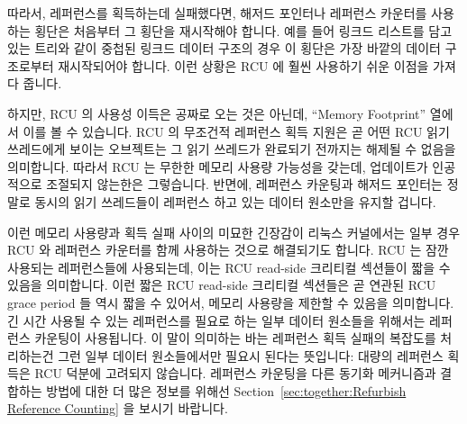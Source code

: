 따라서, 레퍼런스를 획득하는데 실패했다면, 해저드 포인터나 레퍼런스 카운터를
사용하는 횡단은 처음부터 그 횡단을 재시작해야 합니다.
예를 들어 링크드 리스트를 담고 있는 트리와 같이 중첩된 링크드 데이터 구조의
경우 이 횡단은 가장 바깥의 데이터 구조로부터 재시작되어야 합니다.
이런 상황은 RCU 에 훨씬 사용하기 쉬운 이점을 가져다 줍니다.
\iffalse

Thus, when failing to acquire a reference, a hazard-pointer or
reference-counter traversal must restart that traversal from the
beginning.
In the case of nested linked data structures, for example, a
tree containing linked lists, the traversal must be restarted from
the outermost data structure.
This situation gives RCU a significant ease-of-use advantage.
\fi

하지만, RCU 의 사용성 이득은 공짜로 오는 것은 아닌데, ``Memory Footprint''
열에서 이를 볼 수 있습니다.
RCU 의 무조건적 레퍼런스 획득 지원은 곧 어떤 RCU 읽기 쓰레드에게 보이는
오브젝트는 그 읽기 쓰레드가 완료되기 전까지는 해제될 수 없음을 의미합니다.
따라서 RCU 는 무한한 메모리 사용량 가능성을 갖는데, 업데이트가 인공적으로
조절되지 않는한은 그렇습니다.
반면에, 레퍼런스 카운팅과 해저드 포인터는 정말로 동시의 읽기 쓰레드들이
레퍼런스 하고 있는 데이터 원소만을 유지할 겁니다.
\iffalse

However, RCU's ease-of-use advantage does not come
for free, as can be seen in the ``Memory Footprint'' row.
RCU's support of unconditional reference acquisition means that
it must avoid freeing any object reachable by a given
RCU reader until that reader completes.
RCU therefore has an unbounded memory footprint, at least unless updates
are throttled.
In contrast, reference counting and hazard pointers need to  retain only
those data elements actually referenced by concurrent readers.
\fi

이런 메모리 사용량과 획득 실패 사이의 미묘한 긴장감이 리눅스 커널에서는 일부
경우 RCU 와 레퍼런스 카운터를 함께 사용하는 것으로 해결되기도 합니다.
RCU 는 잠깐 사용되는 레퍼런스들에 사용되는데, 이는 RCU read-side 크리티컬
섹션들이 짧을 수 있음을 의미합니다.
이런 짧은 RCU read-side 크리티컬 섹션들은 곧 연관된 RCU grace period 들 역시
짧을 수 있어서, 메모리 사용량을 제한할 수 있음을 의미합니다.
긴 시간 사용될 수 있는 레퍼런스를 필요로 하는 일부 데이터 원소들을 위해서는
레퍼런스 카운팅이 사용됩니다.
이 말이 의미하는 바는 레퍼런스 획득 실패의 복잡도를 처리하는건 그런 일부 데이터
원소들에서만 필요시 된다는 뜻입니다:  대량의 레퍼런스 획득은 RCU 덕분에
고려되지 않습니다.
레퍼런스 카운팅을 다른 동기화 메커니즘과 결합하는 방법에 대한 더 많은 정보를
위해선
Section~\ref{sec:together:Refurbish Reference Counting} 을 보시기 바랍니다.
\iffalse

